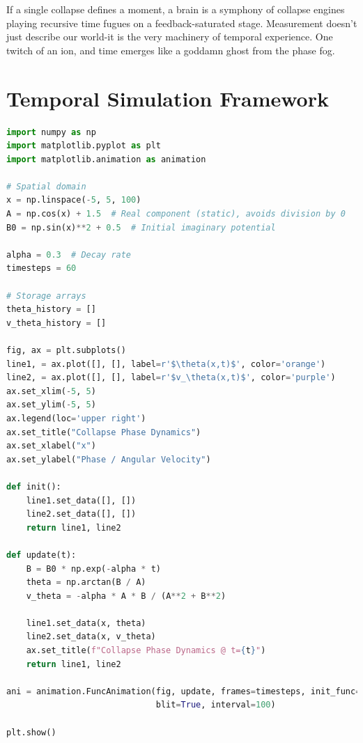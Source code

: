 If a single collapse defines a moment, a brain is a symphony of collapse engines playing recursive time fugues on a feedback-saturated stage. \cite{chapter_time} Measurement doesn’t just describe our world-it is the very machinery of temporal experience. \cite{chapter_time} One twitch of an ion, and time emerges like a goddamn ghost from the phase fog. \cite{chapter_time} \section{Temporal Simulation Framework}
\cite{chapter_time} \begin{lstlisting}[language=Python, caption={Collapse Phase Dynamics as an executable Python script}, label={lst:time1}]
import numpy as np
import matplotlib.pyplot as plt
import matplotlib.animation as animation

# Spatial domain
x = np.linspace(-5, 5, 100)
A = np.cos(x) + 1.5  # Real component (static), avoids division by 0
B0 = np.sin(x)**2 + 0.5  # Initial imaginary potential

alpha = 0.3  # Decay rate
timesteps = 60

# Storage arrays
theta_history = []
v_theta_history = []

fig, ax = plt.subplots()
line1, = ax.plot([], [], label=r'$\theta(x,t)$', color='orange')
line2, = ax.plot([], [], label=r'$v_\theta(x,t)$', color='purple')
ax.set_xlim(-5, 5)
ax.set_ylim(-5, 5)
ax.legend(loc='upper right')
ax.set_title("Collapse Phase Dynamics")
ax.set_xlabel("x")
ax.set_ylabel("Phase / Angular Velocity")

def init():
    line1.set_data([], [])
    line2.set_data([], [])
    return line1, line2

def update(t):
    B = B0 * np.exp(-alpha * t)
    theta = np.arctan(B / A)
    v_theta = -alpha * A * B / (A**2 + B**2)
    
    line1.set_data(x, theta)
    line2.set_data(x, v_theta)
    ax.set_title(f"Collapse Phase Dynamics @ t={t}")
    return line1, line2

ani = animation.FuncAnimation(fig, update, frames=timesteps, init_func=init,
                              blit=True, interval=100)

plt.show()
\end{lstlisting}

